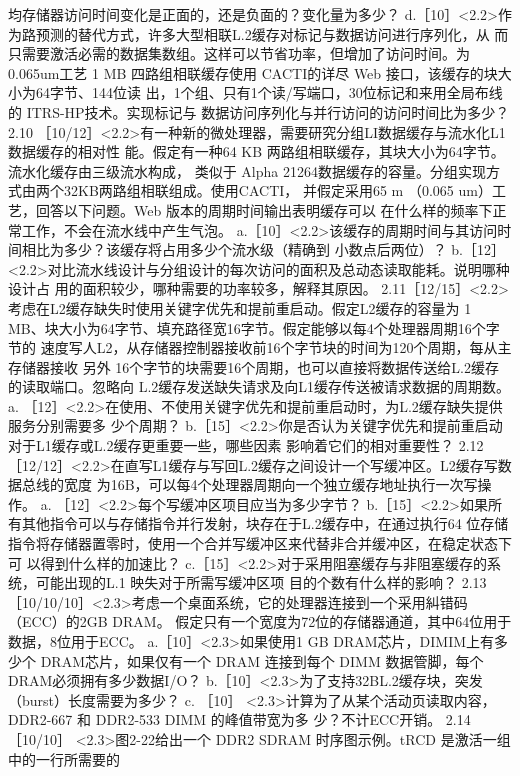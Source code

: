均存储器访问时间变化是正面的，还是负面的？变化量为多少？
d.［10］<2.2>作为路预测的替代方式，许多大型相联L.2缓存对标记与数据访问进行序列化，从
而只需要激活必需的数据集数组。这样可以节省功率，但增加了访问时间。为 0.065um工艺
1 MB 四路组相联缓存使用 CACTI的详尽 Web 接口，该缓存的块大小为64字节、144位读
出，1个组、只有1个读/写端口，30位标记和来用全局布线的 ITRS-HP技术。实现标记与
数据访问序列化与并行访问的访问时间比为多少？
2.10
［10/12］<2.2>有一种新的微处理器，需要研究分组LI数据缓存与流水化L1数据缓存的相对性
能。假定有一种64 KB 两路组相联缓存，其块大小为64字节。流水化缓存由三级流水构成，
类似于 Alpha 21264数据缓存的容量。分组实现方式由两个32KB两路组相联组成。使用CACTI，
并假定采用65 m （0.065 um）工艺，回答以下问题。Web 版本的周期时间输出表明缓存可以
在什么样的频率下正常工作，不会在流水线中产生气泡。
a.［10］<2.2>该缓存的周期时间与其访问时间相比为多少？该缓存将占用多少个流水级（精确到
小数点后两位）？
b.［12］<2.2>对比流水线设计与分组设计的每次访问的面积及总动态读取能耗。说明哪种设计占
用的面积较少，哪种需要的功率较多，解释其原因。
2.11［12/15］<2.2>考虑在L2缓存缺失时使用关键字优先和提前重启动。假定L2缓存的容量为
1 MB、块大小为64字节、填充路径宽16字节。假定能够以每4个处理器周期16个字节的
速度写人L2，从存储器控制器接收前16个字节块的时间为120个周期，每从主存储器接收
另外 16个字节的块需要16个周期，也可以直接将数据传送给L.2缓存的读取端口。忽略向
L.2缓存发送缺失请求及向L1缓存传送被请求数据的周期数。
a. ［12］<2.2>在使用、不使用关键字优先和提前重启动时，为L.2缓存缺失提供服务分别需要多
少个周期？
b.［15］<2.2>你是否认为关键字优先和提前重启动对于L1缓存或L.2缓存更重要一些，哪些因素
影响着它们的相对重要性？
2.12
［12/12］<2.2>在直写L1缓存与写回L.2缓存之间设计一个写缓冲区。L2缓存写数据总线的宽度
为16B，可以每4个处理器周期向一个独立缓存地址执行一次写操作。
a. ［12］<2.2>每个写缓冲区项目应当为多少字节？
b.［15］<2.2>如果所有其他指令可以与存储指令并行发射，块存在于L.2缓存中，在通过执行64
位存储指令将存储器置零时，使用一个合并写缓冲区来代替非合并缓冲区，在稳定状态下可
以得到什么样的加速比？
c.［15］<2.2>对于采用阻塞缓存与非阻塞缓存的系统，可能出现的L.1 映失对于所需写缓冲区项
目的个数有什么样的影响？
2.13 ［10/10/10］<2.3>考虑一个桌面系统，它的处理器连接到一个采用糾错码（ECC）的2GB DRAM。
假定只有一个宽度为72位的存储器通道，其中64位用于数据，8位用于ECC。
a.［10］<2.3>如果使用1 GB DRAM芯片，DIMIM上有多少个 DRAM芯片，如果仅有一个 DRAM
连接到每个 DIMM 数据管脚，每个 DRAM必须拥有多少数据I/O？
b.［10］<2.3>为了支持32BL.2缓存块，突发（burst）长度需要为多少？
c. ［10］ <2.3>计算为了从某个活动页读取内容，DDR2-667 和 DDR2-533 DIMM 的峰值带宽为多
少？不计ECC开销。
2.14 ［10/10］ <2.3>图2-22给出一个 DDR2 SDRAM 时序图示例。tRCD 是激活一组中的一行所需要的
